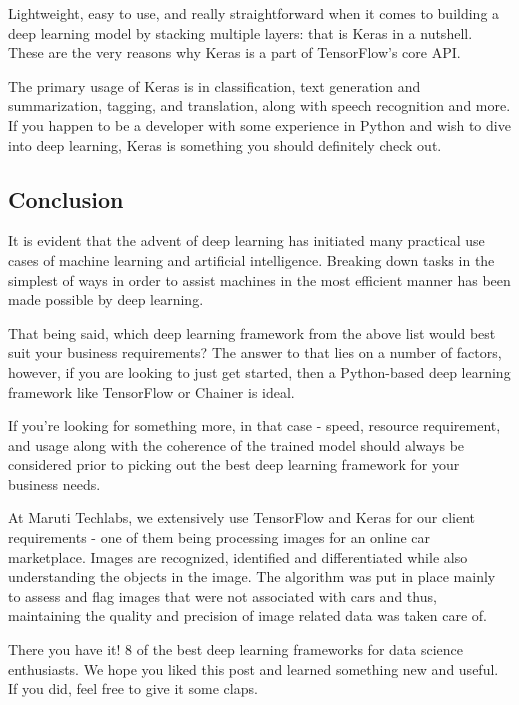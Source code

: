 Lightweight, easy to use, and really straightforward when it comes to building a deep learning model by stacking multiple layers: that is Keras in a nutshell. These are the very reasons why Keras is a part of TensorFlow's core API.

The primary usage of Keras is in classification, text generation and summarization, tagging, and translation, along with speech recognition and more. If you happen to be a developer with some experience in Python and wish to dive into deep learning, Keras is something you should definitely check out.


\subsection{Conclusion}

It is evident that the advent of deep learning has initiated many practical use cases of machine learning and artificial intelligence. Breaking down tasks in the simplest of ways in order to assist machines in the most efficient manner has been made possible by deep learning.

That being said, which deep learning framework from the above list would best suit your business requirements? The answer to that lies on a number of factors, however, if you are looking to just get started, then a Python-based deep learning framework like TensorFlow or Chainer is ideal.

If you're looking for something more, in that case - speed, resource requirement, and usage along with the coherence of the trained model should always be considered prior to picking out the best deep learning framework for your business needs.

At Maruti Techlabs, we extensively use TensorFlow and Keras for our client requirements - one of them being processing images for an online car marketplace. Images are recognized, identified and differentiated while also understanding the objects in the image. The algorithm was put in place mainly to assess and flag images that were not associated with cars and thus, maintaining the quality and precision of image related data was taken care of.

There you have it! 8 of the best deep learning frameworks for data science enthusiasts. We hope you liked this post and learned something new and useful. If you did, feel free to give it some claps.